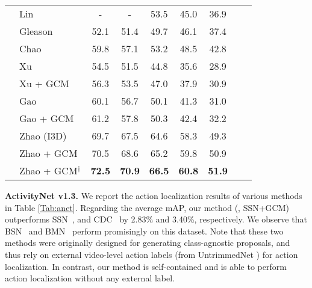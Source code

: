 \documentclass[10pt,journal,compsoc]{IEEEtran}
\begin{document}
\begin{table}[!tb]
\begin{tabular}{clccccccc}
			&Lin \etal \cite{lin2018bsn}              & -             & -             & 53.5          & 45.0          & 36.9                  \\
			&Gleason \etal
			\cite{gleason2019proposal} 
			& 52.1         & 51.4          & 49.7          & 46.1          & 37.4                   \\	 
			&Chao \etal \cite{chao2018rethinking}     & 59.8          & 57.1          & 53.2          & 48.5          & 42.8          \\ \cline{2-7}
			&Xu \etal  \cite{xu2017r}                  & 54.5          & 51.5          & 44.8          & 35.6          & 28.9          \\ 
			&Xu \etal + GCM        & 56.3 & 53.5 & 47.0 & 37.9 & 30.9  \\ 
			&Gao \etal \cite{gao2017cascaded}         & 60.1          & 56.7          & 50.1          & 41.3          & 31.0    \\  
			&Gao \etal +  GCM       & 61.2 & 57.8 & 50.3 & 42.4 & 32.2    \\ 
			&Zhao \etal \cite{zhao2017temporal} (I3D)       & 69.7 & 67.5 & 64.6 & 58.3 & 49.3    \\ 
			&Zhao \etal +  GCM                          & 70.5 & 68.6 & 65.2 & 59.8 & 50.9  \\ 
			&Zhao \etal +  GCM${}^\dagger$                      
			& \textbf{72.5} & \textbf{70.9} & \textbf{66.5} & \textbf{60.8} & \textbf{51.9}  \\\hline
			
		\end{tabular}
		\label{Tab:thumos}
	\end{table}
	

	
	
	\noindent \textbf{ActivityNet v1.3.} We report the action localization results of various methods in Table \ref{Tab:anet}. Regarding the average mAP, our method (\ie, SSN+GCM) outperforms SSN~\cite{zhao2017temporal}, and CDC~\cite{shou2017cdc} by 2.83\% and 3.40\%, respectively. 
	We observe that BSN~\cite{lin2018bsn} and BMN~\cite{lin2019bmn} perform promisingly on this dataset. Note that these two methods were originally designed for generating class-agnostic proposals, and thus rely on external video-level action labels (from UntrimmedNet \cite{wang2017untrimmed}) for action localization.
	In contrast, our method is self-contained and is able to perform action localization without any external label. 
	
\end{document}
